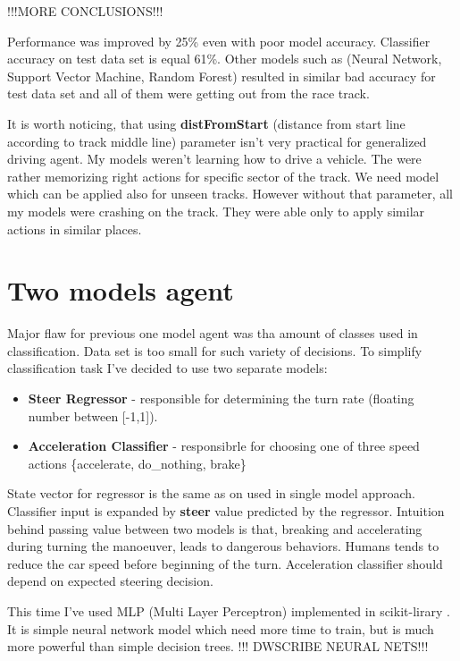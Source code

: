 \documentclass[declaration,shortabstract,english,inz]{iithesis}
\begin{document}
!!!MORE CONCLUSIONS!!!

Performance was improved by 25\% even with poor model accuracy. Classifier accuracy on test data set is equal 61\%. Other models such as (Neural Network, Support Vector Machine, Random Forest) resulted in similar bad accuracy for test data set and all of them were getting out from the race track.   

It is worth noticing, that using \textbf{distFromStart} (distance from start line according to track middle line) parameter isn't very practical for generalized driving agent. My models weren't learning how to drive a vehicle. The were rather memorizing right actions for specific sector of the track. We need model which can be applied also for unseen tracks. However without that parameter, all my models were crashing on the track. They were able only to apply similar actions in similar places.

\section{Two models agent}

Major flaw for previous one model agent was tha amount of classes used in classification. Data set is too small for such variety of decisions. To simplify classification task I've decided to use two separate models: 

\begin{itemize}
    \item \textbf{Steer Regressor} - responsible for determining the turn rate (floating number between [-1,1]).
    \item \textbf{Acceleration Classifier} - responsibrle for choosing one of three speed actions \{accelerate, do\_nothing, brake\}
\end{itemize}

State vector for regressor is the same as on used in single model approach. Classifier input is expanded by \textbf{steer} value predicted by the regressor. Intuition behind passing value between two models is that, breaking and accelerating during turning the manoeuver, leads to dangerous behaviors. Humans tends to reduce the car speed before beginning of the turn. Acceleration classifier should depend on expected steering decision.


This time I've used MLP (Multi Layer Perceptron) implemented in scikit-lirary \cite{scikit_learn}. It is simple neural network model which need more time to train, but is much more powerful than simple decision trees. 
!!! DWSCRIBE NEURAL NETS!!!
\end{document}
